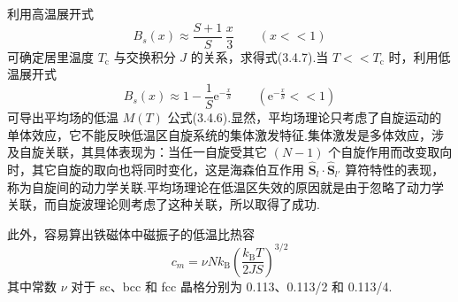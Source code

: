 利用高温展开式
\begin{equation}
  B_s\left(x\right)\approx\frac{S+1}{S}\,\frac{x}{3}\qquad\left(x<\!<1\right)
\end{equation}
可确定居里温度 $T_{\mathrm{c}}$ 与交换积分 $J$
的关系，求得式(3.4.7).当 $T<\!<T_{\mathrm{c}}$ 时，利用低温展开式
\begin{equation}
  B_s\left(x\right)\approx1-\frac{1}{S}\mathrm{e}^{-\frac{x}{S}}\qquad
  \left(\mathrm{e}^{-\frac{x}{S}}<\!<1\right)
\end{equation}
可导出平均场的低温 $M(T)$ 公式(3.4.6).显然，平均场理论只考虑了自旋运动的单体效应，它不能反映低温区自旋系统的集体激发特征.集体激发是多体效应，涉及自旋关联，其具体表现为：当任一自旋受其它
$(N-1)$ 个自旋作用而改变取向时，其它自旋的取向也将同时变化，这是海森伯互作用
$\hat{\boldsymbol{S}}_l\cdot\hat{\boldsymbol{S}}_{l'}$
算符特性的表现，称为自旋间的动力学关联.平均场理论在低温区失效的原因就是由于忽略了动力学关联，而自旋波理论则考虑了这种关联，所以取得了成功.

此外，容易算出铁磁体中磁振子的低温比热容
\begin{equation}
  c_m=\nu Nk_{\mathrm{B}}\left(\frac{k_{\mathrm{B}}T}{2JS}\right)^{3/2}
\end{equation}
其中常数 $\nu$ 对于 sc、bcc 和 fcc 晶格分别为 0.113、0.113/2 和 0.113/4.

